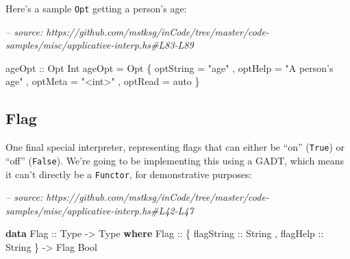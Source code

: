 \documentclass[]{article}
\newenvironment{Shaded}{}{}
\newcommand{\CommentTok}[1]{\textcolor[rgb]{0.38,0.63,0.69}{\textit{#1}}}
\newcommand{\DataTypeTok}[1]{\textcolor[rgb]{0.56,0.13,0.00}{#1}}
\newcommand{\DecValTok}[1]{\textcolor[rgb]{0.25,0.63,0.44}{#1}}
\newcommand{\KeywordTok}[1]{\textcolor[rgb]{0.00,0.44,0.13}{\textbf{#1}}}
\newcommand{\NormalTok}[1]{#1}
\newcommand{\OperatorTok}[1]{\textcolor[rgb]{0.40,0.40,0.40}{#1}}
\newcommand{\OtherTok}[1]{\textcolor[rgb]{0.00,0.44,0.13}{#1}}
\newcommand{\StringTok}[1]{\textcolor[rgb]{0.25,0.44,0.63}{#1}}
\begin{document}
Here's a sample \texttt{Opt} getting a person's age:

\begin{Shaded}
\begin{Highlighting}[]
\CommentTok{-- source: https://github.com/mstksg/inCode/tree/master/code-samples/misc/applicative-interp.hs#L83-L89}

\OtherTok{ageOpt ::} \DataTypeTok{Opt} \DataTypeTok{Int}
\NormalTok{ageOpt }\OtherTok{=} \DataTypeTok{Opt}
\NormalTok{    \{ optString }\OtherTok{=} \StringTok{"age"}
\NormalTok{    , optHelp   }\OtherTok{=} \StringTok{"A person's age"}
\NormalTok{    , optMeta   }\OtherTok{=} \StringTok{"<int>"}
\NormalTok{    , optRead   }\OtherTok{=}\NormalTok{ auto}
\NormalTok{    \}}
\end{Highlighting}
\end{Shaded}

\begin{Shaded}
\end{Shaded}

\hypertarget{flag}{%
\subsection{Flag}\label{flag}}

One final special interpreter, representing flags that can either be ``on''
(\texttt{True}) or ``off'' (\texttt{False}). We're going to be implementing this
using a GADT, which means it can't directly be a \texttt{Functor}, for
demonstrative purposes:

\begin{Shaded}
\begin{Highlighting}[]
\CommentTok{-- source: https://github.com/mstksg/inCode/tree/master/code-samples/misc/applicative-interp.hs#L42-L47}

\KeywordTok{data} \DataTypeTok{Flag}\OtherTok{ ::} \DataTypeTok{Type} \OtherTok{->} \DataTypeTok{Type} \KeywordTok{where}
    \DataTypeTok{Flag}
\OtherTok{      ::}\NormalTok{ \{}\OtherTok{ flagString ::} \DataTypeTok{String}
\NormalTok{         ,}\OtherTok{ flagHelp   ::} \DataTypeTok{String}
\NormalTok{         \}}
      \OtherTok{->} \DataTypeTok{Flag} \DataTypeTok{Bool}
\end{Highlighting}
\end{Shaded}
\end{document}
